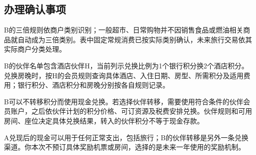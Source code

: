 \documentclass[UTF8,fontset=none,11pt,a4paper]{ctexart}
\begin{document}
\subsection*{办理确认事项}
B的三倍规则依商户类别识别；一般超市、日常购物并不因销售食品或燃油相关商品就自动成为三倍类别。表中固定常规消费已按实际类别确认，未来旅行交易依其实际商户分类处理。


B的伙伴名单包含酒店伙伴H，当前列示兑换比例为1个银行积分换2个酒店积分。兑换房晚时，按H的会员规则查询具体酒店、入住日期、房型、所需积分及适用费用；银行积分、酒店积分和房晚分别按各自规则记录。


B可以不转移积分而使用现金兑换。若选择伙伴转移，需要使用符合条件的伙伴会员账户，之后依伙伴计划的积分价格、可订资源及税费安排兑换。伙伴规则和可用房间、座位决定具体兑换结果，转入的伙伴积分不等于现金存款。


A兑现后的现金可以用于任何正常支出，包括旅行；B的伙伴转移是另外一条兑换渠道。你本次不预订具体奖励机票或房间，选择的是未来一年使用的奖励机制。
\end{document}
